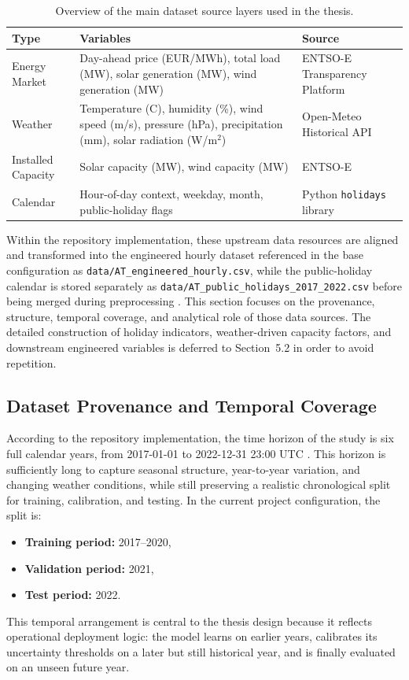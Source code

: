 \begin{table}[htbp]
	\centering
	\caption{Overview of the main dataset source layers used in the thesis.}
	\label{tab:dataset_sources_full}
	\small
	\begin{tabular}{|p{2.8cm}|p{6.0cm}|p{3.2cm}|}
		\hline
		\textbf{Type} & \textbf{Variables} & \textbf{Source} \\
		\hline
		Energy Market & Day-ahead price (EUR/MWh), total load (MW), solar generation (MW), wind generation (MW) & ENTSO-E Transparency Platform \\
		\hline
		Weather & Temperature (\textdegree C), humidity (\%), wind speed (m/s), pressure (hPa), precipitation (mm), solar radiation (W/m$^2$) & Open-Meteo Historical API \\
		\hline
		Installed Capacity & Solar capacity (MW), wind capacity (MW) & ENTSO-E \\
		\hline
		Calendar & Hour-of-day context, weekday, month, public-holiday flags & Python \texttt{holidays} library \\
		\hline
	\end{tabular}
\end{table}

Within the repository implementation, these upstream data resources are aligned and transformed into the engineered hourly dataset referenced in the base configuration as \texttt{data/AT\_engineered\_hourly.csv}, while the public-holiday calendar is stored separately as \texttt{data/AT\_public\_holidays\_2017\_2022.csv} before being merged during preprocessing \cite{repo_thesis_grid_anomaly}. This section focuses on the provenance, structure, temporal coverage, and analytical role of those data sources. The detailed construction of holiday indicators, weather-driven capacity factors, and downstream engineered variables is deferred to Section~5.2 in order to avoid repetition.

\subsection{Dataset Provenance and Temporal Coverage}

According to the repository implementation, the time horizon of the study is six full calendar years, from 2017-01-01 to 2022-12-31 23:00 UTC \cite{repo_thesis_grid_anomaly}. This horizon is sufficiently long to capture seasonal structure, year-to-year variation, and changing weather conditions, while still preserving a realistic chronological split for training, calibration, and testing. In the current project configuration, the split is:
\begin{itemize}
	\item \textbf{Training period:} 2017--2020,
	\item \textbf{Validation period:} 2021,
	\item \textbf{Test period:} 2022.
\end{itemize}
This temporal arrangement is central to the thesis design because it reflects operational deployment logic: the model learns on earlier years, calibrates its uncertainty thresholds on a later but still historical year, and is finally evaluated on an unseen future year.

